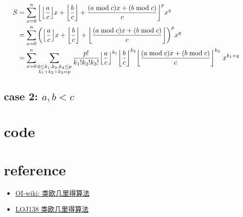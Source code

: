\documentclass{article}
\begin{document}
\[
	\begin{aligned}
		S
		&=\sum_{x=0}^n { \left\lfloor { \left\lfloor \frac{a}{c} \right\rfloor } x+{ \left\lfloor \frac{b}{c} \right\rfloor }+\frac{(a\bmod c)x+(b\bmod c)}{c} \right\rfloor }^p x^q\\
		&=\sum_{x=0}^n
			{\left(
				{ \left\lfloor \frac{a}{c} \right\rfloor }x + { \left\lfloor \frac{b}{c} \right\rfloor } + { \left\lfloor \frac{(a\bmod c)x+(b\bmod c)}{c} \right\rfloor }
			\right)}^p x^q\\
		&=\sum_{x=0}^n
				\sum_{\begin{subarray}{c}0\leq k_1,k_2,k_3\leq p\\ k_1+k_2+k_3=p\end{subarray}}
					\frac{p!}{k_1!k_2!k_3!}
					{ \left\lfloor \frac{a}{c} \right\rfloor }^{k_1}
					{ \left\lfloor \frac{b}{c} \right\rfloor }^{k_2}
					{ \left\lfloor \frac{(a\bmod c)x+(b\bmod c)}{c} \right\rfloor }^{k_3}
					\ x^{k_1 + q}
	\end{aligned}
\]

\subsection*{case 2: $a,b < c$}

\newpage
\appendix

\section{code}

\section{reference}

\begin{itemize}
	\item \href{https://oi-wiki.org/math/euclidean/}{OI-wiki: 类欧几里得算法}
	\item \href{https://loj.ac/p/138}{LOJ138 类欧几里得算法}
\end{itemize}
\end{document}
